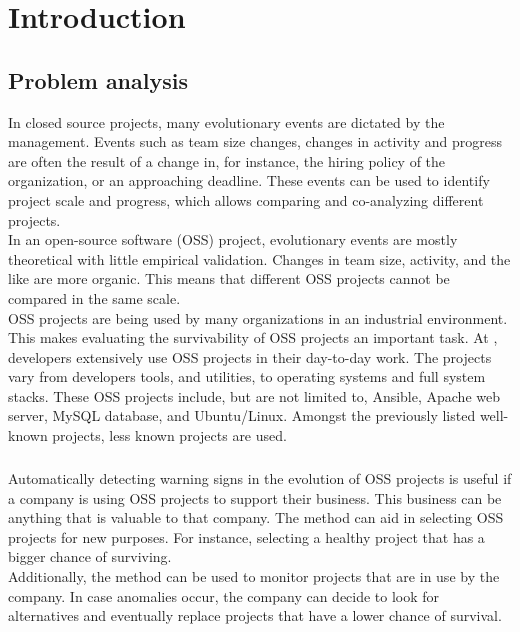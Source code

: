\chapter{Introduction}
\label{introduction}

\section{Problem analysis}

In closed source projects, many evolutionary events are dictated by the
management.
Events such as team size changes, changes in activity and progress are often the
result of a change in, for instance, the hiring policy of the organization, or
an approaching deadline. These events can be used to identify project scale and
progress, which allows comparing and co-analyzing different projects.\\

In an open-source software (OSS) project, evolutionary events are mostly
theoretical with little empirical validation. Changes in team size, activity,
and the like are more organic. This means that different OSS projects cannot be
compared in the same scale.\\

OSS projects are being used by many organizations in an industrial environment.
This makes evaluating the survivability of OSS projects an important task.
At \theOrganization, developers extensively use OSS projects in their day-to-day
work. The projects vary from developers tools, and utilities, to operating
systems and full system stacks. These OSS projects include, but are not limited
to, Ansible, Apache web server, MySQL database, and Ubuntu/Linux. Amongst the
previously listed well-known projects, less known projects are used.

\paragraph{}
Automatically detecting warning signs in the evolution of OSS projects is useful
if a company is using OSS projects to support their business. This business can
be anything that is valuable to that company. The method can aid in selecting
OSS projects for new purposes. For instance, selecting a healthy project that
has a bigger chance of surviving.\\

Additionally, the method can be used to monitor projects that are in use by the
company. In case anomalies occur, the company can decide to look for
alternatives and eventually replace projects that have a lower chance of
survival.

